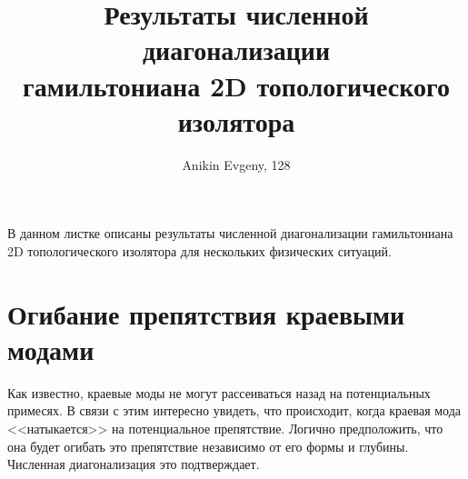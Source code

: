 \documentclass{article}
\title{Результаты численной диагонализации\\ 
      гамильтониана 2D топологического изолятора }
\author{Anikin Evgeny, 128}
\begin{document}
    \maketitle
    В данном листке описаны результаты численной диагонализации 
    гамильтониана 2D топологического изолятора для нескольких 
    физических ситуаций.
    \section{Огибание препятствия краевыми модами}
    Как известно, краевые моды не могут рассеиваться назад на потенциальных примесях. 
    В связи с этим интересно увидеть, что происходит, когда краевая мода <<натыкается>> на
    потенциальное препятствие. Логично предположить, что она будет огибать это препятствие
    независимо от его формы и глубины. Численная диагонализация это подтверждает.
\end{document}
